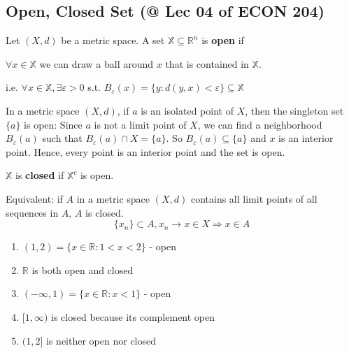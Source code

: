 \documentclass[11pt]{elegantbook}
\begin{document}
\subsection{Open, Closed Set \small{(@ Lec 04 of ECON 204)}}
\begin{definition}
    Let $(X, d)$ be a metric space. A set $\mathbb{X} \subseteq \mathbb{R}^{n}$ is \textbf{open} if
    
    $\forall x \in \mathbb{X}$ we can draw a ball around $x$ that is contained in $\mathbb{X}$.

    i.e. $\forall x \in \mathbb{X}, \exists \varepsilon>0$ s.t. $B_\varepsilon(x)=\{y:d(y,x)<\varepsilon\} \subseteq \mathbb{X}$
\end{definition}

\begin{example}
    In a metric space $(X, d)$, if $a$ is an isolated point of $X$, then the singleton set $\{a\}$ is open: Since $a$ is not a limit point of $X$, we can find a neighborhood $B_\varepsilon(a)$ such that $B_\varepsilon(a)\cap X = \{a\}$. So $B_\varepsilon(a) \subseteq \{a\}$ and $x$ is an interior point. Hence, every point is an interior point and the set is open.
\end{example}

\begin{definition}
    $\mathbb{X}$ is \textbf{closed} if $\mathbb{X}^c$ is open.
\end{definition}
\begin{theorem}
    Equivalent: if $A$ in a metric space $(X, d)$ contains all limit points of all sequences in $A$, $A$ is closed.
    $$\{x_n\}\subset A, x_n \rightarrow x\in X \Rightarrow x\in A$$
\end{theorem}
\begin{example}
\end{example}
\begin{enumerate}[1)]
    \item $(1,2)=\{x \in \mathbb{R}: 1<x<2\}$ - open
    \item $\mathbb{R}$ is both open and closed
    \item $(-\infty, 1)=\{x \in \mathbb{R}: x<1\}$ - open
    \item $[1, \infty)$ is closed because its complement open
    \item $(1,2]$ is neither open nor closed
\end{enumerate}
\end{document}
